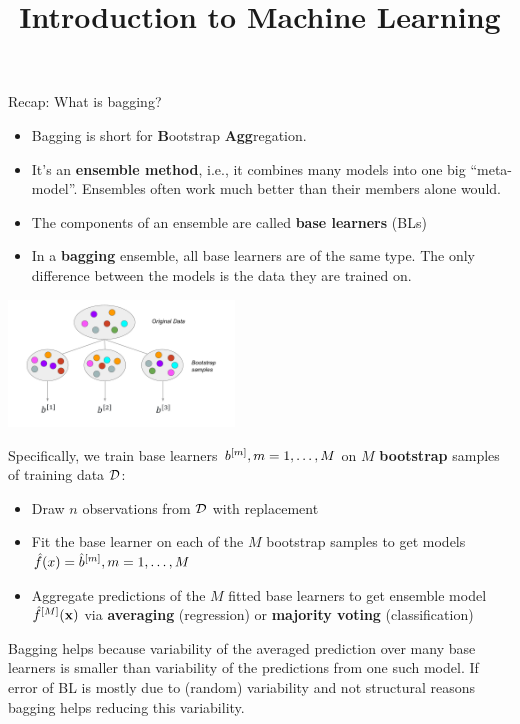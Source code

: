 \documentclass[11pt,compress,t,notes=noshow, xcolor=table]{beamer}
\title{Introduction to Machine Learning}
\date{}
\begin{document}



\begin{vbframe}{Recap: What is bagging?}

\begin{itemize}
  \item Bagging is short for \textbf{B}ootstrap \textbf{Agg}regation.
  \item It's an \textbf{ensemble method}, i.e., it combines many models into one 
        big \enquote{meta-model}. Ensembles often work much better than their members alone would.
  \item The components of an ensemble are called \textbf{base learners} (BLs)
  \item In a \textbf{bagging} ensemble, all base learners are of the same type. The only difference between the models is the data they are trained on.\\
\end{itemize}

\begin{center}
\includegraphics[width=0.45\textwidth]{figure_man/bagging.pdf}
\end{center}

\framebreak 
Specifically, we train base learners $b^{[m]}, m = 1, \dots, M$ on $M$ \textbf{bootstrap} samples of training data $\mathcal{D}$:
\begin{itemize}  \setlength{\itemsep}{1.0em}
  \item Draw $n$ observations from $\mathcal{D}$ with replacement
  \item Fit the base learner on each of the $M$ bootstrap samples to get models $\hat{f}(x) = \hat{b}^{[m]}, m = 1, \dots, M$
\item Aggregate predictions of the $M$ fitted base learners to get ensemble model $\hat f^{[M]}(\mathbf{x})$ via \textbf{averaging} (regression) or \textbf{majority voting} (classification)
\end{itemize}
\vspace{0.1cm}
{\small Bagging helps because variability of the averaged prediction over many base learners is smaller than variability of the predictions from one such model. If error of BL is mostly due to (random) variability and not structural reasons bagging helps reducing this variability.}



\end{vbframe}
\end{document}
